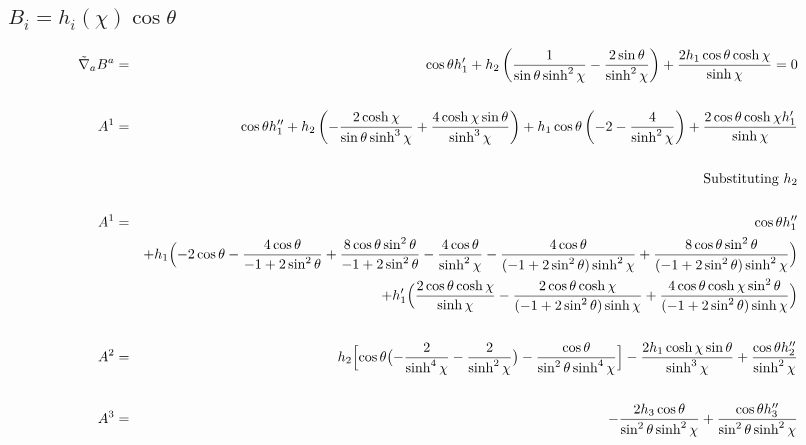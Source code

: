 \documentclass[10pt,letterpaper]{article}
\numberwithin{equation}{section}
\begin{document}
\subsection{$B_i = h_i(\chi)\cos\theta$}
\begin{eqnarray}
\tilde\nabla_a B^a&=& \cos\theta h'_{1} + h_{2} \left(\frac{1}{\sin\theta \sinh^2\chi} -  \frac{2 \sin\theta}{\sinh^2\chi}\right) + \frac{2 h_{1} \cos\theta \cosh\chi}{\sinh\chi}=0
\\ \nonumber\\
A^1&=& \cos\theta h''_{1} + h_{2} \left(- \frac{2 \cosh\chi}{\sin\theta \sinh^3\chi} + \frac{4 \cosh\chi \sin\theta}{\sinh^3\chi}\right) + h_{1} \cos\theta \left(-2 -  \frac{4}{\sinh^2\chi}\right) + \frac{2 \cos\theta \cosh\chi h'_{1}}{\sinh\chi}
\\ \nonumber\\
&&\text{Substituting $h_2$}
\\ \nonumber\\
A^1&=& \cos\theta h''_{1} \nonumber \\ 
&& + h_{1} \Bigl(-2 \cos\theta -  \frac{4 \cos\theta}{-1 + 2 \sin^2\theta} + \frac{8 \cos\theta \sin^2\theta}{-1 + 2 \sin^2\theta} -  \frac{4 \cos\theta}{\sinh^2\chi} -  \frac{4 \cos\theta}{(-1 + 2 \sin^2\theta) \sinh^2\chi} + \frac{8 \cos\theta \sin^2\theta}{(-1 + 2 \sin^2\theta) \sinh^2\chi}\Bigr) \nonumber \\ 
&& + h'_{1} \Bigl(\frac{2 \cos\theta \cosh\chi}{\sinh\chi} -  \frac{2 \cos\theta \cosh\chi}{(-1 + 2 \sin^2\theta) \sinh\chi} + \frac{4 \cos\theta \cosh\chi \sin^2\theta}{(-1 + 2 \sin^2\theta) \sinh\chi}\Bigr)
\\ \nonumber\\
A^2&=& h_{2} \Bigl[\cos\theta \bigl(- \frac{2}{\sinh^4\chi} -  \frac{2}{\sinh^2\chi}\bigr) -  \frac{\cos\theta}{\sin^2\theta \sinh^4\chi}\Bigr] -  \frac{2 h_{1} \cosh\chi \sin\theta}{\sinh^3\chi} + \frac{\cos\theta h''_{2}}{\sinh^2\chi}
\\ \nonumber\\
A^3&=& - \frac{2 h_{3} \cos\theta}{\sin^2\theta \sinh^2\chi} + \frac{\cos\theta h''_{3}}{\sin^2\theta \sinh^2\chi}
\end{eqnarray}
%
%
%
%
\newpage
\end{document}
